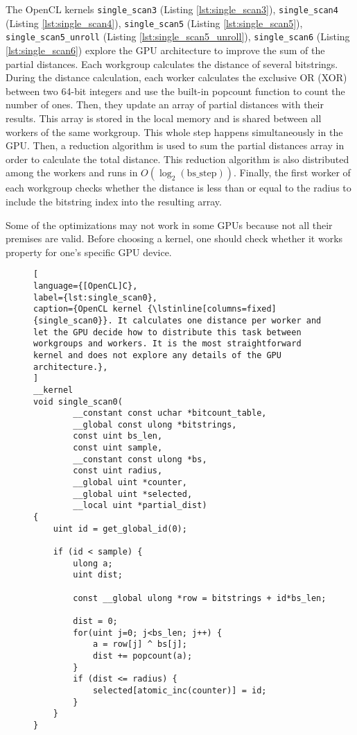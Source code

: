 The OpenCL kernels \lstinline{single_scan3} (Listing \ref{lst:single_scan3}), \lstinline{single_scan4} (Listing \ref{lst:single_scan4}), \lstinline{single_scan5} (Listing \ref{lst:single_scan5}), \lstinline{single_scan5_unroll} (Listing \ref{lst:single_scan5_unroll}), \lstinline{single_scan6} (Listing \ref{lst:single_scan6}) explore the GPU architecture to improve the sum of the partial distances. Each workgroup calculates the distance of several bitstrings. During the distance calculation, each worker calculates the exclusive OR (XOR) between two 64-bit integers and use the built-in popcount function to count the number of ones. Then, they update an array of partial distances with their results. This array is stored in the local memory and is shared between all workers of the same workgroup. This whole step happens simultaneously in the GPU. Then, a reduction algorithm is used to sum the partial distances array in order to calculate the total distance. This reduction algorithm is also distributed among the workers and runs in $O(\log_2(\text{bs\_step}))$. Finally, the first worker of each workgroup checks whether the distance is less than or equal to the radius to include the bitstring index into the resulting array.

Some of the optimizations may not work in some GPUs because not all their premises are valid. Before choosing a kernel, one should check whether it works property for one's specific GPU device.


\begin{figure}[!p]
\begin{lstlisting}[
language={[OpenCL]C},
label={lst:single_scan0},
caption={OpenCL kernel {\lstinline[columns=fixed]{single_scan0}}. It calculates one distance per worker and let the GPU decide how to distribute this task between workgroups and workers. It is the most straightforward kernel and does not explore any details of the GPU architecture.},
]
__kernel
void single_scan0(
		__constant const uchar *bitcount_table,
		__global const ulong *bitstrings,
		const uint bs_len,
		const uint sample,
		__constant const ulong *bs,
		const uint radius,
		__global uint *counter,
		__global uint *selected,
		__local uint *partial_dist)
{
	uint id = get_global_id(0);

	if (id < sample) {
		ulong a;
		uint dist;

		const __global ulong *row = bitstrings + id*bs_len;

		dist = 0;
		for(uint j=0; j<bs_len; j++) {
			a = row[j] ^ bs[j];
			dist += popcount(a);
		}
		if (dist <= radius) {
			selected[atomic_inc(counter)] = id;
		}
	}
}
\end{lstlisting}
\end{figure}


